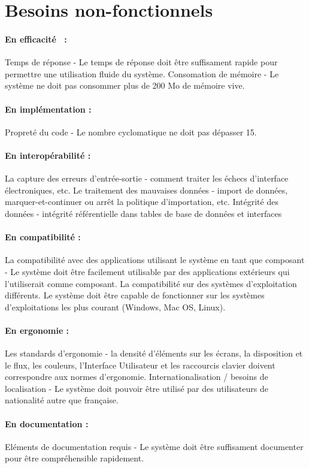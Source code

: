 \documentclass[12pt,a4paper,openany]{report}
\begin{document}
	\section{Besoins non-fonctionnels}
		\paragraph{En efficacité~ :}
		Temps de réponse - Le temps de réponse doit être suffisament rapide pour permettre une utilisation fluide du système.
		Consomation de mémoire - Le système ne doit pas consommer plus de 200 Mo de mémoire vive.
		\paragraph{En implémentation :}
		Propreté du code - Le nombre cyclomatique ne doit pas dépasser 15.
		\paragraph{En interopérabilité :}
		La capture des erreurs d'entrée-sortie - comment traiter les échecs d'interface électroniques, etc.
		Le traitement des mauvaises données - import de données, marquer-et-continuer ou arrêt la politique d'importation, etc.
		Intégrité des données - intégrité référentielle dans tables de base de données et interfaces
		\paragraph{En compatibilité :}
		La compatibilité avec des applications utilisant le système en tant que composant - Le système doit être facilement
		utilisable par des applications extérieurs qui l'utiliserait comme composant.
		La compatibilité sur des systèmes d'exploitation différents. Le système doit être capable de fonctionner sur les 
		systèmes d'exploitations les plus courant (Windows, Mac OS, Linux).
		\paragraph{En ergonomie :}
		Les standards d'ergonomie - la densité d'éléments sur les écrans, la disposition et le flux, les couleurs, l'Interface 
		Utilisateur et les raccourcis clavier doivent correspondre aux normes d'ergonomie.
		Internationalisation / besoins de localisation - Le système doit pouvoir être utilisé par des utilisateurs de nationalité autre que française.
		\paragraph{En documentation :}
		Eléments de documentation requis - Le système doit être suffisament documenter pour être compréhensible rapidement.
	\newpage
\end{document}

